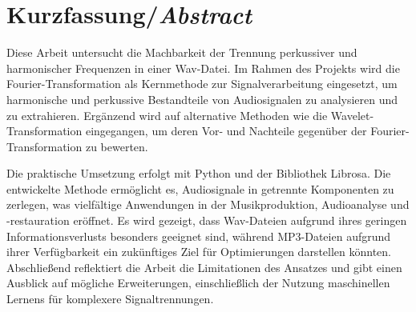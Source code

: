 \chapter*{Kurzfassung/\emph{Abstract}}
\label{chap:abstract}
%

Diese Arbeit untersucht die Machbarkeit der Trennung perkussiver und harmonischer Frequenzen in einer Wav-Datei.
Im Rahmen des Projekts wird die Fourier-Transformation als Kernmethode zur Signalverarbeitung eingesetzt, um harmonische und perkussive Bestandteile von Audiosignalen zu analysieren und zu extrahieren.
Ergänzend wird auf alternative Methoden wie die Wavelet-Transformation eingegangen, um deren Vor- und Nachteile gegenüber der Fourier-Transformation zu bewerten.

\par

Die praktische Umsetzung erfolgt mit Python und der Bibliothek Librosa.
Die entwickelte Methode ermöglicht es, Audiosignale in getrennte Komponenten zu zerlegen, was vielfältige Anwendungen in der Musikproduktion, Audioanalyse und -restauration eröffnet.
Es wird gezeigt, dass Wav-Dateien aufgrund ihres geringen Informationsverlusts besonders geeignet sind, während MP3-Dateien aufgrund ihrer Verfügbarkeit ein zukünftiges Ziel für Optimierungen darstellen könnten.
Abschließend reflektiert die Arbeit die Limitationen des Ansatzes und gibt einen Ausblick auf mögliche Erweiterungen, einschließlich der Nutzung maschinellen Lernens für komplexere Signaltrennungen.